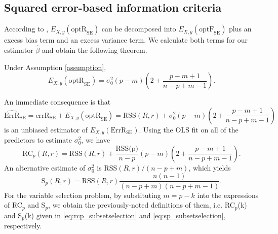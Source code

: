 \subsection{Squared error-based information criteria}
According to \citet[formula 6 and proposition 1]{rosset2020fixed}, $E_{X,y}(\text{optR}_\text{SE})$ can be decomposed into $E_{X,y}(\text{optF}_\text{SE})$ plus an excess bias term and an excess variance term. We calculate both terms for our estimator $\hat\beta$ and obtain the following theorem.
\begin{theorem}
Under Assumption \ref{assumption},
\begin{equation*}
E_{X,y}(\text{optR}_\text{SE}) = \sigma_0^2(p-m) \left( 2+ \frac{p-m+1}{n-p+m-1} \right).
\end{equation*}
\label{thm:EoptR_SE}
\end{theorem}
An immediate consequence is that
\begin{equation*}
\widehat{\text{ErrR}}_\text{SE} = \text{errR}_\text{SE} + E_{X,y} (\text{optR}_\text{SE}) = \text{RSS}(R,r) + \sigma_0^2(p-m) \left( 2+ \frac{p-m+1}{n-p+m-1} \right)
\end{equation*}
is an unbiased estimator of $E_{X,y}(\text{ErrR}_\text{SE})$. Using the OLS fit on all of the predictors to estimate $\sigma_0^2$, we have 
\begin{equation*}
\text{RC}_p(R,r) = \text{RSS}(R,r) + \frac{\text{RSS(p)}}{n-p}(p-m) \left(2+\frac{p-m+1}{n-p+m-1}\right).
\end{equation*}
An alternative estimate of $\sigma_0^2$ is $\text{RSS}(R,r)/(n-p+m)$, which yields 
\begin{equation*}
\text{S}_p(R,r) = \text{RSS}(R,r)\frac{n(n-1)}{(n-p+m)(n-p+m-1)}.
\end{equation*}
For the variable selection problem, by substituting $m=p-k$ into the expressions of RC$_p$ and S$_p$, we obtain the previously-noted definitions of them, i.e. RC$_p$(k) and S$_p$(k) given in \eqref{eq:rcp_subsetselection} and \eqref{eq:sp_subsetselection}, respectively. 
